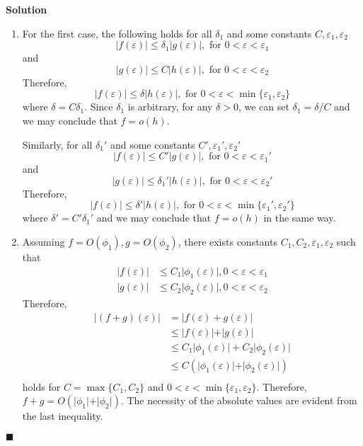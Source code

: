 \documentclass[11pt]{article}
\newcommand{\vep}{\varepsilon}
\theoremstyle{problemstyle}
\newenvironment{solution}
  {\noindent\textbf{Solution}\quad}
  {\hfill$\blacksquare$\par\vspace{1em}}
\begin{document}
\begin{solution}
  \begin{enumerate}
    \item For the first case, the following holds for all $\delta_1$ and some constants $C,
      \vep_1, \vep_2$
      \[ \vert f(\vep) \vert \leq \delta_1 \vert g(\vep) \vert,  \text{ for } 0 < \vep < \vep_1 \]
      and
      \[ \vert g(\vep) \vert \leq C \vert h(\vep) \vert, \text{ for } 0 < \vep < \vep_2 \]
      Therefore,
      \[ \vert f(\vep) \vert \leq \delta \vert h(\vep) \vert, \text{ for } 0 < \vep <
      \min\{\vep_1, \vep_2\} \]
      where $\delta = C \delta_1$. Since $\delta_1$ is arbitrary, for any $\delta > 0$, we can set
      $\delta_1 = \delta / C$ and we may conclude that $f = o(h)$.

      Similarly, for all $\delta_1'$ and some constants $C', \vep_1', \vep_2'$ 
      \[ \vert f(\vep) \vert \leq C' \vert g(\vep) \vert,  \text{ for } 0 < \vep < \vep_1' \]
      and
      \[ \vert g(\vep) \vert \leq \delta_1' \vert h(\vep) \vert, \text{ for } 0 < \vep < \vep_2' \]
      Therefore,
      \[ \vert f(\vep) \vert \leq \delta' \vert h(\vep) \vert, \text{ for } 0 < \vep <
      \min\{\vep_1', \vep_2'\} \]
      where $\delta' = C' \delta_1'$ and we may conclude that $f = o(h)$ in the same way. 
    \item Assuming $f = O(\phi_1), g = O(\phi_2)$, there exists constants $C_1,C_2,\vep_1,\vep_2$
      such that
      \begin{align*}
        \vert f(\vep) \vert & \leq C_1 \vert \phi_1(\vep) \vert, 0 < \vep < \vep_1 \\
        \vert g(\vep) \vert & \leq C_2 \vert \phi_2(\vep) \vert, 0 < \vep < \vep_2
      \end{align*}
      Therefore,
      \begin{align*}
        \vert (f + g)(\vep) \vert 
          & = \vert f(\vep) + g(\vep) \vert \\
          & \leq \vert f(\vep) \vert + \vert g(\vep) \vert \\
          & \leq C_1 \vert \phi_1(\vep) \vert + C_2 \vert \phi_2(\vep) \vert \\
          & \leq C \left( \vert \phi_1(\vep) \vert + \vert \phi_2(\vep) \vert \right) \\
      \end{align*}
      holds for $C = \max\{C_1, C_2\}$ and $0 < \vep < \min\{\vep_1, \vep_2\}$.
      Therefore, $f + g = O(\vert \phi_1 \vert + \vert \phi_2 \vert)$. The necessity of the absolute
      values are evident from the last inequality.
  \end{enumerate} 
\end{solution}
\end{document}
